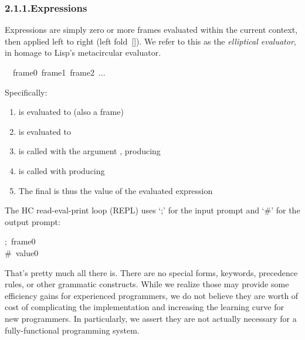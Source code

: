 \documentclass[preprint]{{acmart}}
\begin{document}
\subsubsection{2.1.1.\hspace*{0.5em}Expressions}\label{sec-expressions}%

\noindent{}Expressions are simply zero or more frames evaluated within the current
context, then applied left to right (left fold~{}[]). We refer to
this as the \emph{elliptical evaluator}, in homage to Lisp's metacircular
evaluator.%
\begin{mdpre}%
\noindent~~frame0~frame1~frame2~{...}%
\end{mdpre}\noindent{}Specifically:

\begin{enumerate}[noitemsep,topsep=\mdcompacttopsep]%

\item{} is evaluated to  (also a frame)%

\item{} is evaluated to %

\item{} is called with the argument , producing %

\item{} is called with  producing %

\item{}The final  is thus the value of the evaluated expression%
\end{enumerate}%

\noindent{}The HC read-eval-print loop (REPL) uses \textquoteleft{};\textquoteright{} for the input prompt and \textquoteleft{}\#\textquoteright{} for the
output prompt:%
\begin{mdpre}%
\noindent;~frame0\\
{\#~value0}%
\end{mdpre}\noindent{}That's pretty much all there is. There are no special forms, keywords,
precedence rules, or other grammatic constructs. While we realize those
may provide some efficiency gains for experienced programmers, we do not
believe they are worth of cost of complicating the implementation and
increasing the learning curve for new programmers. In particularly,
we assert they are not actually necessary for a fully-functional programming system.
\end{document}
